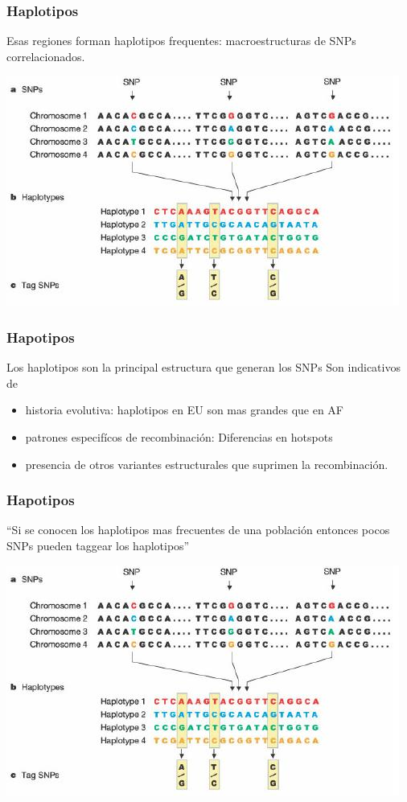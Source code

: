 \documentclass{beamer}\usepackage[]{graphicx}\usepackage[]{color}
\begin{document}
\begin{frame}[fragile] 
\frametitle{Haplotipos}

Esas regiones forman haplotipos frequentes: 
macroestructuras de SNPs correlacionados.

\includegraphics[width=0.8\linewidth]{haplo.jpg}

\end{frame}


\begin{frame}[fragile] 
\frametitle{Hapotipos}

Los haplotipos son la principal estructura que generan los SNPs
Son indicativos de
\begin{itemize}
\item historia evolutiva: haplotipos en EU son mas grandes que en AF
\item patrones especif\'icos de recombinaci\'on: Diferencias en hotspots
\item presencia de otros variantes estructurales que suprimen la recombinaci\'on.
\end{itemize}

\end{frame}


\begin{frame}[fragile] 
\frametitle{Hapotipos}

``Si se conocen los haplotipos mas frecuentes de una poblaci\'on
entonces pocos SNPs pueden taggear los haplotipos''

\includegraphics[width=0.8\linewidth]{haplo.jpg}

\end{frame}
\end{document}
